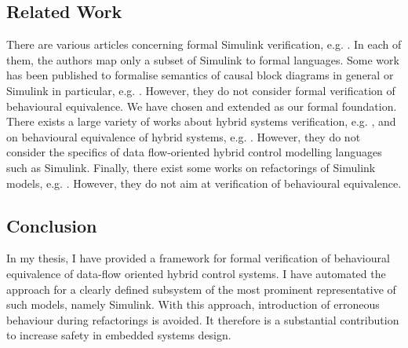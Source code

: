 \documentclass[conference]{IEEEtran}
\begin{document}
\subsection*{Related Work}
There are various articles concerning formal Simulink verification, e.g. \cite{Reicherdt.2014,.2013b,Tripakis.2005}. In each of them, the authors map only a subset of Simulink to formal languages. Some work has been published to formalise semantics of causal block diagrams in general or Simulink in particular, e.g. \cite{Bouissou.2012,gomes2016causal,dragomir2016compositional}. However, they do not consider formal verification of behavioural equivalence. We have chosen and extended \cite{Bouissou.2012} as our formal foundation. There exists a large variety of works about hybrid systems verification, e.g. \cite{fulton2015keymaera,alur2011formal}, and on behavioural equivalence of hybrid systems, e.g. \cite{Girard.2011}. However, they do not consider the specifics of data flow-oriented hybrid control modelling languages such as Simulink. Finally, there exist some works on refactorings of Simulink models, e.g. \cite{.2013}. However, they do not aim at verification of behavioural equivalence. 


\subsection*{Conclusion}
In my thesis, I have provided a framework for formal verification of behavioural equivalence of data-flow oriented hybrid control systems. I have automated the approach for a clearly defined subsystem of the most prominent representative of such models, namely Simulink. %
With this approach, introduction of erroneous behaviour during refactorings is avoided. It therefore is a substantial contribution to increase safety in embedded systems design.




\end{document}
